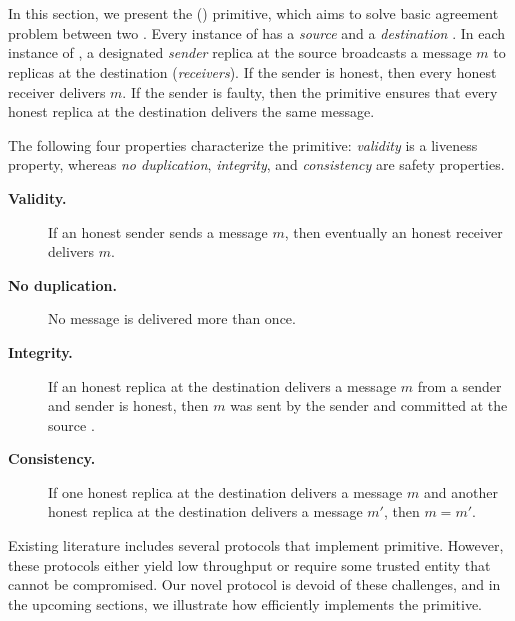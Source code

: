 \section{\CCCFull{}}
In this section, we present the \CCCFull{} (\CCC{}) primitive, which aims to solve basic agreement 
problem between two .
Every instance of \CCC{} has a {\em source} \RSM{} and a {\em destination} \RSM{}.
In each instance of \CCC{}, a designated {\em sender} replica at the source \RSM{} 
broadcasts a message $m$ to replicas at the destination \RSM{} ({\em receivers}).
If the sender is honest, then every honest receiver delivers $m$.
If the sender is faulty, then the primitive ensures that every honest replica at the  
destination \RSM{} delivers the same message.

The following four properties characterize the \CCC{} primitive: 
{\em validity} is a liveness property, whereas 
{\em no duplication}, {\em integrity}, and {\em consistency} are safety properties.

\begin{description}
\item[\bf Validity.]
If an honest sender sends a message $m$, then eventually an honest receiver delivers $m$.

\item[\bf No duplication.] 
No message is delivered more than once.

\item[\bf Integrity.]
If an honest replica at the destination \RSM{} delivers a message $m$ from a sender 
and sender is honest, 
then $m$ was sent by the sender and committed at the source \RSM{}.

\item[\bf Consistency.]
If one honest replica at the destination \RSM{} delivers a message $m$ and another 
honest replica at the destination \RSM{} delivers a message $m'$, then $m = m'$. 
\end{description}

Existing literature includes several protocols that implement \CCC{} primitive. 
However, these protocols either yield low throughput or require some trusted entity 
that cannot be compromised.
Our novel \Scrooge{} protocol is devoid of these challenges, and 
in the upcoming sections, we illustrate how \Scrooge{} efficiently implements the \CCC{} primitive.
